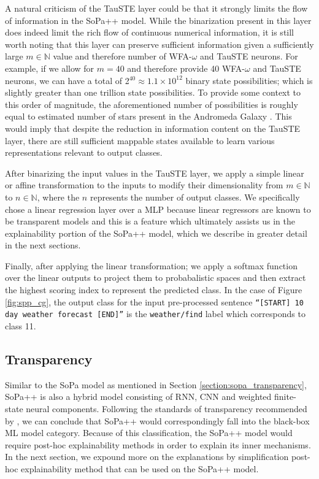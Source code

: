 A natural criticism of the TauSTE layer could be that it strongly limits the
flow of information in the SoPa++ model. While the binarization present in this
layer does indeed limit the rich flow of continuous numerical information, it is
still worth noting that this layer can preserve sufficient information given a
sufficiently large $m \in \mathbb{N}$ value and therefore number of WFA-$\omega$
and TauSTE neurons. For example, if we allow for $m=40$ and therefore provide 40
WFA-$\omega$ and TauSTE neurons, we can have a total of
2$^{40}\approx1.1\times10^{12}$ binary state possibilities; which is slightly
greater than one trillion state possibilities. To provide some context to this
order of magnitude, the aforementioned number of possibilities is roughly equal
to estimated number of stars present in the Andromeda Galaxy
\citep{10.1093/mnras/stu879}. This would imply that despite the reduction in
information content on the TauSTE layer, there are still sufficient mappable
states available to learn various representations relevant to output classes.

After binarizing the input values in the TauSTE layer, we apply a simple linear
or affine transformation to the inputs to modify their dimensionality from $m
\in \mathbb{N}$ to $n \in \mathbb{N}$, where the $n$ represents the number of
output classes. We specifically chose a linear regression layer over a MLP
because linear regressors are known to be transparent models
\citep{arrieta2020explainable} and this is a feature which ultimately assists us
in the explainability portion of the SoPa++ model, which we describe in greater
detail in the next sections.

Finally, after applying the linear transformation; we apply a softmax function
over the linear outputs to project them to probabalistic spaces and then extract
the highest scoring index to represent the predicted class. In the case of
Figure \ref{fig:spp_cg}, the output class for the input pre-processed sentence
\texttt{``[START] 10 day weather forecast [END]''} is the \texttt{weather/find} label
which corresponds to class 11.

\subsection{Transparency}

\label{section:spp_transparency}

Similar to the SoPa model as mentioned in Section
\ref{section:sopa_transparency}, SoPa++ is also a hybrid model consisting of
RNN, CNN and weighted finite-state neural components. Following the standards of
transparency recommended by \citet{arrieta2020explainable}, we can conclude that
SoPa++ would correspondingly fall into the black-box ML model category. Because
of this classification, the SoPa++ model would require post-hoc explainability
methods in order to explain its inner mechanisms. In the next section, we
expound more on the explanations by simplification post-hoc explainability
method that can be used on the SoPa++ model.

